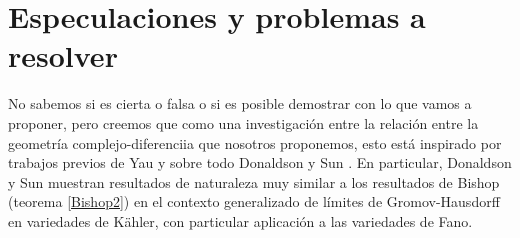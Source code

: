 \documentclass[letterpaper]{beamer}
\begin{document}
\section{Especulaciones y problemas a resolver}
\begin{frame}

    No sabemos si es cierta o falsa o si es posible demostrar con lo que vamos a proponer, pero creemos que como una
    investigaci\'on entre la relaci\'on entre la geometr\'ia complejo-diferenciia que nosotros proponemos, esto est\'a inspirado por trabajos
    previos de Yau \cite{S-Yau} y sobre todo Donaldson y Sun \cite{D-SS}. En particular, Donaldson y Sun muestran resultados de naturaleza muy similar
    a los resultados de Bishop (teorema \ref{Bishop2}) en el contexto generalizado de l\'imites de Gromov-Hausdorff en variedades de
    K\"ahler, con particular aplicaci\'on a las variedades de Fano.


\end{frame}
\end{document}
